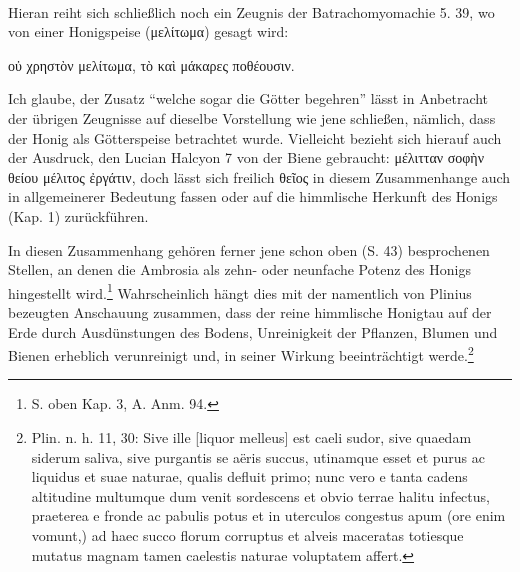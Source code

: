 \documentclass[a4paper, 11pt, oneside]{article}
\begin{document}
\paragraph{}
Hieran reiht sich schließlich noch ein Zeugnis der Batrachomyomachie 5. 39, wo von einer Honigspeise (μελίτωμα) gesagt wird:

οὐ χρηστὸν μελίτωμα, τὸ καὶ μάκαρες ποθέουσιν.

Ich glaube, der Zusatz "`welche sogar die Götter begehren"' lässt in Anbetracht der übrigen Zeugnisse auf dieselbe Vorstellung wie jene schließen, nämlich, dass der Honig als Götterspeise betrachtet wurde. Vielleicht bezieht sich hierauf auch der Ausdruck, den Lucian Halcyon 7 von der Biene gebraucht: μέλιτταν σοφὴν θείου μέλιτος ἐργάτιν, doch lässt sich freilich θεῖος in diesem Zusammenhange auch in allgemeinerer Bedeutung fassen oder auf die himmlische Herkunft des Honigs (Kap. 1) zurückführen.

In diesen Zusammenhang gehören ferner jene schon oben (S. 43) besprochenen Stellen, an denen die Ambrosia als zehn- oder neunfache Potenz des Honigs hingestellt wird.\footnote{S. oben Kap. 3, A. Anm. 94.} Wahrscheinlich hängt dies mit der namentlich von Plinius bezeugten Anschauung zusammen, dass der reine himmlische Honigtau auf der Erde durch Ausdünstungen des Bodens, Unreinigkeit der Pflanzen, Blumen und Bienen erheblich verunreinigt und, in seiner Wirkung beeinträchtigt werde.\footnote{Plin. n. h. 11, 30: Sive ille [liquor melleus] est caeli sudor, sive quaedam siderum saliva, sive purgantis se aëris succus, utinamque esset et purus ac liquidus et suae naturae, qualis defluit primo; nunc vero e tanta cadens altitudine multumque dum venit sordescens et obvio terrae halitu infectus, praeterea e fronde ac pabulis potus et in uterculos congestus apum (ore enim vomunt,) ad haec succo florum corruptus et alveis maceratas totiesque mutatus magnam tamen caelestis naturae voluptatem affert.}
\end{document}
